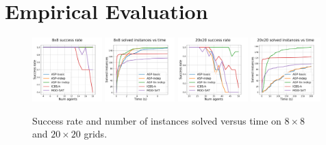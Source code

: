 \section{Empirical Evaluation}


\begin{figure}
    \includegraphics[width=0.24\textwidth]{graphs/8x8succ.pdf}
    \includegraphics[width=0.24\textwidth]{graphs/8x8runtime.pdf}
    \includegraphics[width=0.24\textwidth]{graphs/20x20succ.pdf}
    \includegraphics[width=0.24\textwidth]{graphs/20x20runtime.pdf}
    \caption{Success rate and number of instances solved versus time on $8\times 8$ and $20\times 20$ grids.}

    \label{fig_obs}
\end{figure}

